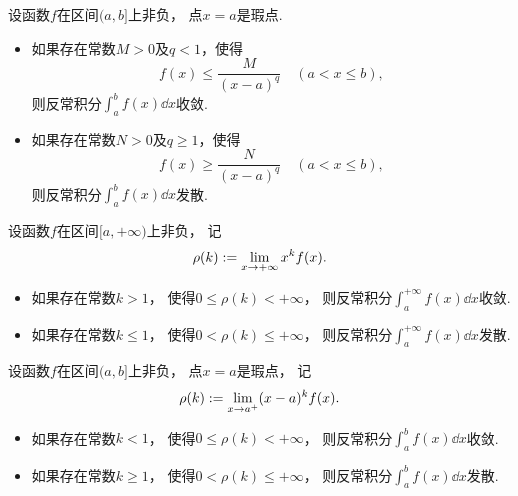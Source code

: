 \begin{theorem}[比较审敛法2]\label{theorem:定积分.无界函数的反常积分的比较审敛法}
设函数\(f\)在区间\((a,b]\)上非负，
点\(x=a\)是瑕点.
\begin{itemize}
	\item 如果存在常数\(M > 0\)及\(q < 1\)，使得\[
		f(x) \leq \frac{M}{(x-a)^q}
		\quad(a < x \leq b),
	\]
	则反常积分\(\int_a^b f(x) \dd{x}\)收敛.
	\item 如果存在常数\(N > 0\)及\(q \geq 1\)，使得\[
		f(x) \geq \frac{N}{(x-a)^q}
		\quad(a < x \leq b),
	\]
	则反常积分\(\int_a^b f(x) \dd{x}\)发散.
\end{itemize}
\end{theorem}

\begin{theorem}[极限审敛法1]\label{theorem:定积分.无穷限反常积分的极限审敛法}
设函数\(f\)在区间\([a,+\infty)\)上非负，
记\[
	\rho(k) := \lim_{x\to+\infty} x^k f(x).
\]
\begin{itemize}
	\item 如果存在常数\(k > 1\)，
	使得\(0 \leq \rho(k) < +\infty\)，
	则反常积分\(\int_a^{+\infty} f(x) \dd{x}\)收敛.
	\item 如果存在常数\(k \leq 1\)，
	使得\(0 < \rho(k) \leq +\infty\)，
	则反常积分\(\int_a^{+\infty} f(x) \dd{x}\)发散.
\end{itemize}
\end{theorem}

\begin{theorem}[极限审敛法2]\label{theorem:定积分.无界函数的反常积分的极限审敛法}
设函数\(f\)在区间\((a,b]\)上非负，
点\(x=a\)是瑕点，
记\[
	\rho(k) := \lim_{x\to a^+} (x-a)^k f(x).
\]
\begin{itemize}
	\item 如果存在常数\(k < 1\)，
	使得\(0 \leq \rho(k) < +\infty\)，
	则反常积分\(\int_a^b f(x) \dd{x}\)收敛.

	\item 如果存在常数\(k \geq 1\)，
	使得\(0 < \rho(k) \leq +\infty\)，
	则反常积分\(\int_a^b f(x) \dd{x}\)发散.
\end{itemize}
\end{theorem}

